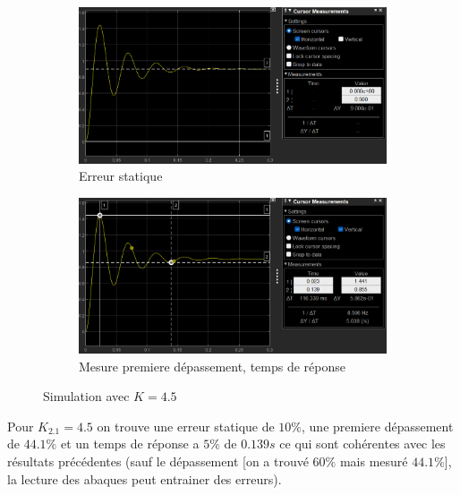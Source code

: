 \documentclass[12pt, a4paper]{report}
\begin{document}
\begin{figure}[H]
    \begin{subfigure}[h!]{0.4\linewidth}
        \includegraphics[width=\linewidth]{sim2kpourerreur10prc.png}
        \caption{Erreur statique}
    \end{subfigure}
    \hfill    
    \begin{subfigure}[h!]{0.4\linewidth}
        \includegraphics[width=\linewidth]{sim2kpourerreur10prcdeptr.png}
        \caption{Mesure premiere dépassement, temps de réponse}
    \end{subfigure}
    \caption{Simulation avec $K = 4.5$}
    \label{fig:sim2Kpour10prc}
\end{figure}

Pour $K_{2.1} = 4.5$ on trouve une erreur statique de $10\%$, une premiere dépassement de $44.1\%$ et un temps de
réponse a $5\%$ de $0.139s$ ce qui sont cohérentes avec les résultats précédentes (sauf le dépassement [on a trouvé $60\%$ mais mesuré $44.1\%$], la lecture des abaques peut entrainer des erreurs).
\end{document}
